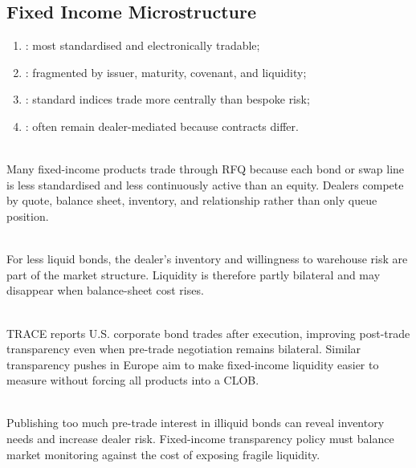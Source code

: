 \subsection{Fixed Income Microstructure}

\begin{taxonomy} 
\begin{enumerate}[label=\roman*.]
\setlength{\itemsep}{0pt}
\item {}: most standardised and electronically tradable;
\item {}: fragmented by issuer, maturity, covenant, and liquidity;
\item {}: standard indices trade more centrally than bespoke risk;
\item {}: often remain dealer-mediated because contracts differ.
\end{enumerate}
\end{taxonomy}

\begin{principle} \\
Many fixed-income products trade through RFQ because each bond or swap line is less standardised and less continuously active than an equity. Dealers compete by quote, balance sheet, inventory, and relationship rather than only queue position.
\end{principle}

\begin{mechanism} \\
For less liquid bonds, the dealer's inventory and willingness to warehouse risk are part of the market structure. Liquidity is therefore partly bilateral and may disappear when balance-sheet cost rises.
\end{mechanism}

\begin{marketrule} \\
TRACE reports U.S. corporate bond trades after execution, improving post-trade transparency even when pre-trade negotiation remains bilateral. Similar transparency pushes in Europe aim to make fixed-income liquidity easier to measure without forcing all products into a CLOB.
\end{marketrule}

\begin{caveat} \\
Publishing too much pre-trade interest in illiquid bonds can reveal inventory needs and increase dealer risk. Fixed-income transparency policy must balance market monitoring against the cost of exposing fragile liquidity.
\end{caveat}

